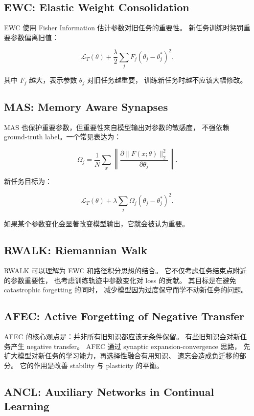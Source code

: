 \documentclass[11pt]{article}
\begin{document}
\subsection{EWC: Elastic Weight Consolidation}

EWC 使用 Fisher Information 估计参数对旧任务的重要性。
新任务训练时惩罚重要参数偏离旧值：

\[
\mathcal{L}_{T}(\theta)
+
\frac{\lambda}{2}
\sum_j
F_j
(\theta_j-\theta_j^{*})^2.
\]

其中 \(F_j\) 越大，表示参数 \(\theta_j\) 对旧任务越重要，
训练新任务时越不应该大幅修改。

\subsection{MAS: Memory Aware Synapses}

MAS 也保护重要参数，但重要性来自模型输出对参数的敏感度，
不强依赖 ground-truth label。一个常见表达为：

\[
\Omega_j
=
\frac{1}{N}
\sum_x
\left\|
\frac{\partial \|F(x;\theta)\|_2^2}{\partial \theta_j}
\right\|.
\]

新任务目标为：

\[
\mathcal{L}_{T}(\theta)
+
\lambda
\sum_j
\Omega_j
(\theta_j-\theta_j^{*})^2.
\]

如果某个参数变化会显著改变模型输出，它就会被认为重要。

\subsection{RWALK: Riemannian Walk}

RWALK 可以理解为 EWC 和路径积分思想的结合。
它不仅考虑任务结束点附近的参数重要性，
也考虑训练轨迹中参数变化对 loss 的贡献。
其目标是在避免 catastrophic forgetting 的同时，
减少模型因为过度保守而学不动新任务的问题。

\subsection{AFEC: Active Forgetting of Negative Transfer}

AFEC 的核心观点是：并非所有旧知识都应该无条件保留。
有些旧知识会对新任务产生 negative transfer。
AFEC 通过 synaptic expansion-convergence 思路，
先扩大模型对新任务的学习能力，再选择性融合有用知识、
遗忘会造成负迁移的部分。
它的作用是改善 stability 与 plasticity 的平衡。

\subsection{ANCL: Auxiliary Networks in Continual Learning}
\end{document}
